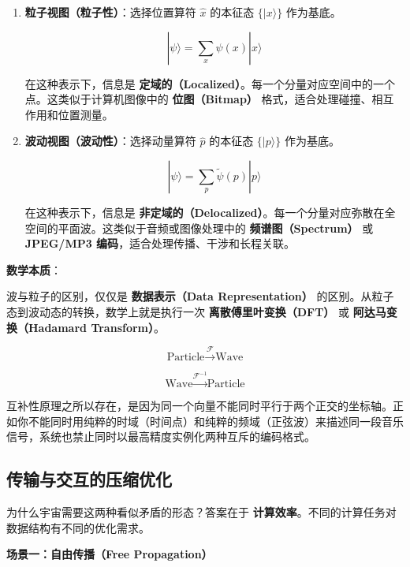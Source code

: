 \begin{enumerate}
\item \textbf{粒子视图（粒子性）}：选择位置算符 $\hat{x}$ 的本征态 $\{|x\rangle\}$ 作为基底。

    \begin{equation}
    |\psi\rangle = \sum_x \psi(x) |x\rangle
    \end{equation}

    在这种表示下，信息是 \textbf{定域的（Localized）}。每一个分量对应空间中的一个点。这类似于计算机图像中的 \textbf{位图（Bitmap）} 格式，适合处理碰撞、相互作用和位置测量。

\item \textbf{波动视图（波动性）}：选择动量算符 $\hat{p}$ 的本征态 $\{|p\rangle\}$ 作为基底。

    \begin{equation}
    |\psi\rangle = \sum_p \tilde{\psi}(p) |p\rangle
    \end{equation}

    在这种表示下，信息是 \textbf{非定域的（Delocalized）}。每一个分量对应弥散在全空间的平面波。这类似于音频或图像处理中的 \textbf{频谱图（Spectrum）} 或 \textbf{JPEG/MP3 编码}，适合处理传播、干涉和长程关联。
\end{enumerate}

\textbf{数学本质}：

波与粒子的区别，仅仅是 \textbf{数据表示（Data Representation）} 的区别。从粒子态到波动态的转换，数学上就是执行一次 \textbf{离散傅里叶变换（DFT）} 或 \textbf{阿达马变换（Hadamard Transform）}。

$$\text{Particle} \xrightarrow{\mathcal{F}} \text{Wave}$$

$$\text{Wave} \xrightarrow{\mathcal{F}^{-1}} \text{Particle}$$

互补性原理之所以存在，是因为同一个向量不能同时平行于两个正交的坐标轴。正如你不能同时用纯粹的时域（时间点）和纯粹的频域（正弦波）来描述同一段音乐信号，系统也禁止同时以最高精度实例化两种互斥的编码格式。

\subsection{传输与交互的压缩优化}

为什么宇宙需要这两种看似矛盾的形态？答案在于 \textbf{计算效率}。不同的计算任务对数据结构有不同的优化需求。

\textbf{场景一：自由传播（Free Propagation）}

